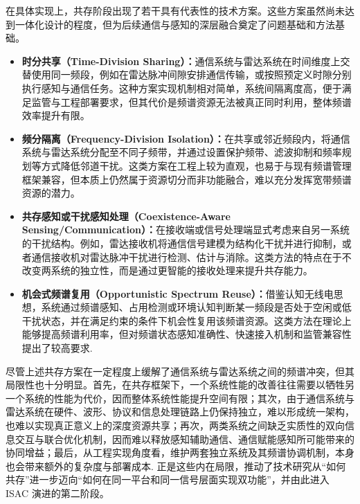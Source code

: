 在具体实现上，共存阶段出现了若干具有代表性的技术方案。这些方案虽然尚未达到一体化设计的程度，但为后续通信与感知的深层融合奠定了问题基础和方法基础。
\begin{itemize}
    \item \textbf{时分共享（Time-Division Sharing）：}通信系统与雷达系统在时间维度上交替使用同一频段，例如在雷达脉冲间隙安排通信传输，或按照预定义时隙分别执行感知与通信任务。这种方案实现机制相对简单，系统间隔离度高，便于满足监管与工程部署要求，但其代价是频谱资源无法被真正同时利用，整体频谱效率提升有限\cite{Chiriyath2017RadarCommCoexistence}。
    \item \textbf{频分隔离（Frequency-Division Isolation）：}在共享或邻近频段内，将通信系统与雷达系统分配至不同子频带，并通过设置保护频带、滤波抑制和频率规划等方式降低邻道干扰。这类方案在工程上较为直观，也易于与现有频谱管理框架兼容，但本质上仍然属于资源切分而非功能融合，难以充分发挥宽带频谱资源的潜力\cite{ITU_R_RR2024}。
    \item \textbf{共存感知或干扰感知处理（Coexistence-Aware Sensing/Communication）：}在接收端或信号处理端显式考虑来自另一系统的干扰结构。例如，雷达接收机将通信信号建模为结构化干扰并进行抑制，或者通信接收机对雷达脉冲干扰进行检测、估计与消除。这类方法的特点在于不改变两系统的独立性，而是通过更智能的接收处理来提升共存能力\cite{Chiriyath2017RadarCommCoexistence,Liu2020JointRadarComm}。
    \item \textbf{机会式频谱复用（Opportunistic Spectrum Reuse）：}借鉴认知无线电思想，系统通过频谱感知、占用检测或环境认知判断某一频段是否处于空闲或低干扰状态，并在满足约束的条件下机会性复用该频谱资源。这类方法在理论上能够提高频谱利用率，但对频谱状态感知准确性、快速接入机制和监管兼容性提出了较高要求\cite{Chiriyath2017RadarCommCoexistence,Haykin2005CognitiveRadio}.
\end{itemize}

尽管上述共存方案在一定程度上缓解了通信系统与雷达系统之间的频谱冲突，但其局限性也十分明显。首先，在共存框架下，一个系统性能的改善往往需要以牺牲另一个系统的性能为代价，因而整体系统性能提升空间有限；其次，由于通信系统与雷达系统在硬件、波形、协议和信息处理链路上仍保持独立，难以形成统一架构，也难以实现真正意义上的深度资源共享；再次，两类系统之间缺乏实质性的双向信息交互与联合优化机制，因而难以释放感知辅助通信、通信赋能感知所可能带来的协同增益；最后，从工程实现角度看，维护两套独立系统及其频谱协调机制，本身也会带来额外的复杂度与部署成本\cite{Liu2020JointRadarComm,Liu2022ISAC}. 正是这些内在局限，推动了技术研究从“如何共存”进一步迈向“如何在同一平台和同一信号层面实现双功能”，并由此进入 ISAC 演进的第二阶段。

